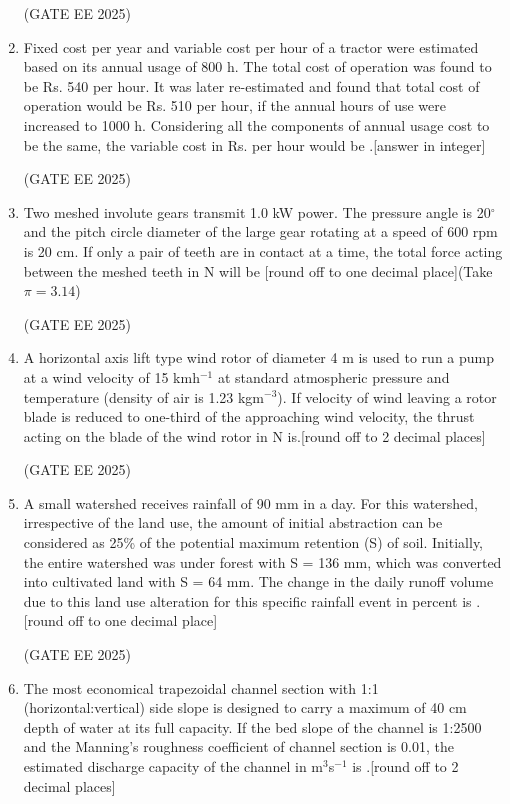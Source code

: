 \documentclass[journal,12pt,onecolumn]{IEEEtran}
\theoremstyle{remark}
\begin{document}
\begin{enumerate}
\hfill(GATE EE 2025)

\item Fixed cost per year and variable cost per hour of a tractor were estimated based on its annual usage of 800 h. The total cost of operation was found to be Rs. 540 per hour. It was later re-estimated and found that total cost of operation would be Rs. 510 per hour, if the annual hours of use were increased to 1000 h. Considering all the components of annual usage cost to be the same, the variable cost in Rs. per hour would be \underline{\hspace{2cm}}.{[answer in integer]}

\hfill(GATE EE 2025)

\item Two meshed involute gears transmit 1.0 kW power. The pressure angle is 20$^\circ$ and the pitch circle diameter of the large gear rotating at a speed of 600 rpm is 20 cm. If only a pair of teeth are in contact at a time, the total force acting between the meshed teeth in N will be \underline{\hspace{2cm}} {[round off to one decimal place]}(Take $\pi = 3.14$)

\hfill(GATE EE 2025)

\item A horizontal axis lift type wind rotor of diameter 4 m is used to run a pump at a wind velocity of 15 kmh$^{-1}$ at standard atmospheric pressure and temperature (density of air is 1.23 kgm$^{-3}$). If velocity of wind leaving a rotor blade is reduced to one-third of the approaching wind velocity, the thrust acting on the blade of the wind rotor in N is\underline{\hspace{2cm}}.{[round off to 2 decimal places]}

\hfill(GATE EE 2025)

\item A small watershed receives rainfall of 90 mm in a day. For this watershed, irrespective of the land use, the amount of initial abstraction can be considered as 25\% of the potential maximum retention (S) of soil. Initially, the entire watershed was under forest with S = 136 mm, which was converted into cultivated land with S = 64 mm. The change in the daily runoff volume due to this land use alteration for this specific rainfall event in percent is \underline{\hspace{2cm}}.{[round off to one decimal place]}

\hfill(GATE EE 2025)

\item The most economical trapezoidal channel section with 1:1 (horizontal:vertical) side slope is designed to carry a maximum of 40 cm depth of water at its full capacity. If the bed slope of the channel is 1:2500 and the Manning's roughness coefficient of channel section is 0.01, the estimated discharge capacity of the channel in m$^3$s$^{-1}$ is \underline{\hspace{2cm}}.{[round off to 2 decimal places]}


\end{enumerate}
\end{document}
